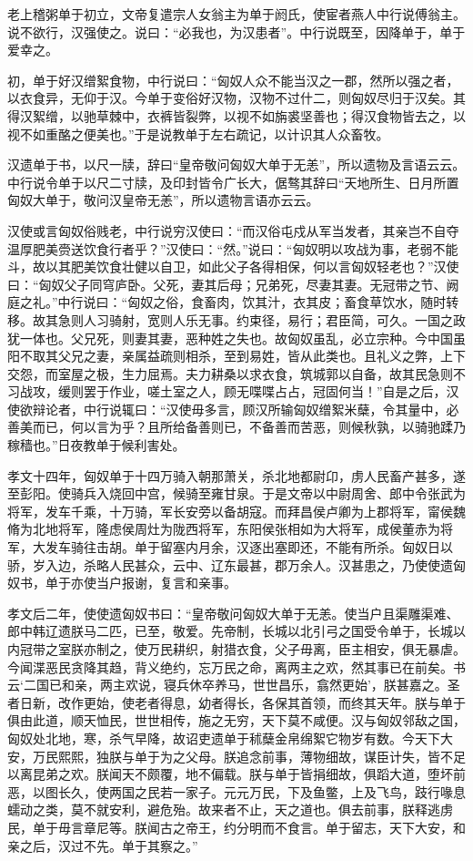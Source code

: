 \documentclass[]{article}
\begin{document}
老上稽粥单于初立，文帝复遣宗人女翁主为单于阏氏，使宦者燕人中行说傅翁主。说不欲行，汉强使之。说曰：``必我也，为汉患者''。中行说既至，因降单于，单于爱幸之。

初，单于好汉缯絮食物，中行说曰：``匈奴人众不能当汉之一郡，然所以强之者，以衣食异，无仰于汉。今单于变俗好汉物，汉物不过什二，则匈奴尽归于汉矣。其得汉絮缯，以驰草棘中，衣裤皆裂弊，以视不如旃裘坚善也；得汉食物皆去之，以视不如重酪之便美也。''于是说教单于左右疏记，以计识其人众畜牧。

汉遗单于书，以尺一牍，辞曰``皇帝敬问匈奴大单于无恙''，所以遗物及言语云云。中行说令单于以尺二寸牍，及印封皆令广长大，倨骜其辞曰``天地所生、日月所置匈奴大单于，敬问汉皇帝无恙''，所以遗物言语亦云云。

汉使或言匈奴俗贱老，中行说穷汉使曰：``而汉俗屯戍从军当发者，其亲岂不自夺温厚肥美赍送饮食行者乎？''汉使曰：``然。''说曰：``匈奴明以攻战为事，老弱不能斗，故以其肥美饮食壮健以自卫，如此父子各得相保，何以言匈奴轻老也？''汉使曰：``匈奴父子同穹庐卧。父死，妻其后母；兄弟死，尽妻其妻。无冠带之节、阙庭之礼。''中行说曰：``匈奴之俗，食畜肉，饮其汁，衣其皮；畜食草饮水，随时转移。故其急则人习骑射，宽则人乐无事。约束径，易行；君臣简，可久。一国之政犹一体也。父兄死，则妻其妻，恶种姓之失也。故匈奴虽乱，必立宗种。今中国虽阳不取其父兄之妻，亲属益疏则相杀，至到易姓，皆从此类也。且礼义之弊，上下交怨，而室屋之极，生力屈焉。夫力耕桑以求衣食，筑城郭以自备，故其民急则不习战攻，缓则罢于作业，嗟土室之人，顾无喋喋占占，冠固何当！''自是之后，汉使欲辩论者，中行说辄曰：``汉使毋多言，顾汉所输匈奴缯絮米蘖，令其量中，必善美而已，何以言为乎？且所给备善则已，不备善而苦恶，则候秋孰，以骑驰蹂乃稼穑也。''日夜教单于候利害处。

孝文十四年，匈奴单于十四万骑入朝那萧关，杀北地都尉卬，虏人民畜产甚多，遂至彭阳。使骑兵入烧回中宫，候骑至雍甘泉。于是文帝以中尉周舍、郎中令张武为将军，发车千乘，十万骑，军长安旁以备胡寇。而拜昌侯卢卿为上郡将军，甯侯魏脩为北地将军，隆虑侯周灶为陇西将军，东阳侯张相如为大将军，成侯董赤为将军，大发车骑往击胡。单于留塞内月余，汉逐出塞即还，不能有所杀。匈奴日以骄，岁入边，杀略人民甚众，云中、辽东最甚，郡万余人。汉甚患之，乃使使遗匈奴书，单于亦使当户报谢，复言和亲事。

孝文后二年，使使遗匈奴书曰：``皇帝敬问匈奴大单于无恙。使当户且渠雕渠难、郎中韩辽遗朕马二匹，已至，敬爱。先帝制，长城以北引弓之国受令单于，长城以内冠带之室朕亦制之，使万民耕织，射猎衣食，父子毋离，臣主相安，俱无暴虐。今闻渫恶民贪降其趋，背义绝约，忘万民之命，离两主之欢，然其事已在前矣。书云`二国已和亲，两主欢说，寝兵休卒养马，世世昌乐，翕然更始'，朕甚嘉之。圣者日新，改作更始，使老者得息，幼者得长，各保其首领，而终其天年。朕与单于俱由此道，顺天恤民，世世相传，施之无穷，天下莫不咸便。汉与匈奴邻敌之国，匈奴处北地，寒，杀气早降，故诏吏遗单于秫蘖金帛绵絮它物岁有数。今天下大安，万民熙熙，独朕与单于为之父母。朕追念前事，薄物细故，谋臣计失，皆不足以离昆弟之欢。朕闻天不颇覆，地不偏载。朕与单于皆捐细故，俱蹈大道，堕坏前恶，以图长久，使两国之民若一家子。元元万民，下及鱼鳖，上及飞鸟，跂行喙息蠕动之类，莫不就安利，避危殆。故来者不止，天之道也。俱去前事，朕释逃虏民，单于毋言章尼等。朕闻古之帝王，约分明而不食言。单于留志，天下大安，和亲之后，汉过不先。单于其察之。''
\end{document}

